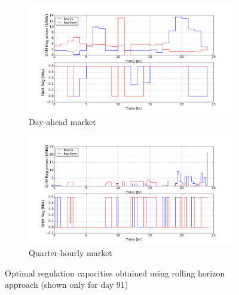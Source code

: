 \documentclass[11pt,twoside]{article}
\begin{document}
\begin{figure}[h!tp]
\centering
\begin{subfigure}[b]{0.49\textwidth} \includegraphics[width=\textwidth]{Figures/Plots/Horizon/DAM_Reg.pdf} \caption{Day-ahead market}\label{damreghor} \end{subfigure} \hfill
\begin{subfigure}[b]{0.49\textwidth} \includegraphics[width=\textwidth]{Figures/Plots/Horizon/QHM_Reg.pdf} \caption{Quarter-hourly market}\label{qhmreghor} \end{subfigure} \hfill
\caption{Optimal regulation capacities obtained using rolling horizon approach (shown only for day 91)}\label{reghor}
\end{figure}
\end{document}
